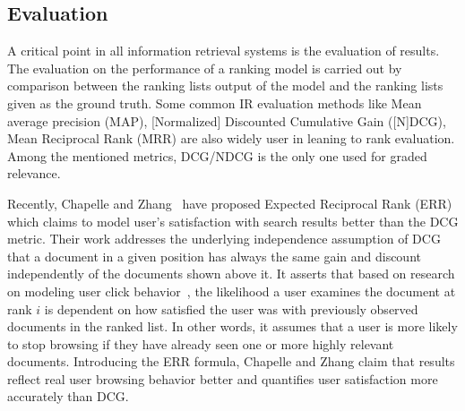 \subsection{Evaluation}

A critical point in all information retrieval systems is the evaluation of results. The evaluation on the performance of a ranking model is carried out by comparison between the ranking lists output of the model and the ranking lists given as the ground truth. Some common IR evaluation methods like Mean average precision (MAP), [Normalized] Discounted Cumulative Gain ([N]DCG), Mean Reciprocal Rank (MRR) are also widely user in leaning to rank evaluation. Among the mentioned metrics, DCG/NDCG is the only one used for graded relevance.

Recently, Chapelle and Zhang~\cite{l2r-err} have proposed Expected Reciprocal Rank (ERR) which claims to model user's satisfaction with search results better than the DCG metric. Their work addresses the underlying independence assumption of DCG that a document in a given position has always the same gain and discount independently of the documents shown above it. It asserts that based on research on modeling user click behavior~\cite{l2r-clickmodel1,l2r-clickmodel2}, the likelihood a user examines the document at rank $i$ is dependent on how satisfied the user was with previously observed documents in the ranked list. In other words, it assumes that a user is more likely to stop browsing if they have already seen one or more highly relevant documents. Introducing the ERR formula, Chapelle and Zhang claim that results reflect real user browsing behavior better and quantifies user satisfaction more accurately than DCG.
